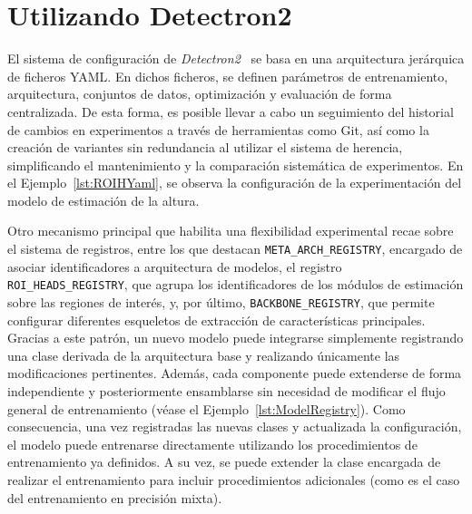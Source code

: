 \section{Utilizando Detectron2}\label{app:YAMLConfig}
El sistema de configuración de \emph{Detectron2}~\cite{detectron2} se basa en una arquitectura jerárquica de ficheros YAML.
En dichos ficheros, se definen parámetros de entrenamiento, arquitectura, conjuntos de datos, optimización y evaluación de forma centralizada.
De esta forma, es posible llevar a cabo un seguimiento del historial de cambios en experimentos a través de herramientas como Git, así como
la creación de variantes sin redundancia al utilizar el sistema de herencia, simplificando el mantenimiento y la comparación sistemática de experimentos.
En el Ejemplo~\ref{lst:ROIHYaml}, se observa la configuración de la experimentación del modelo de estimación de la altura.
\par
Otro mecanismo principal que habilita una flexibilidad experimental recae sobre el sistema de registros, entre los que
destacan \lstinline{META_ARCH_REGISTRY}, encargado de asociar identificadores a arquitectura de modelos, el registro \lstinline{ROI_HEADS_REGISTRY},
que agrupa los identificadores de los módulos de estimación sobre las regiones de interés,
y, por último, \lstinline{BACKBONE_REGISTRY}, que permite configurar diferentes esqueletos de extracción de características principales.
Gracias a este patrón, un nuevo modelo puede integrarse simplemente registrando una clase derivada de la arquitectura base y
realizando únicamente las modificaciones pertinentes.
Además, cada componente puede extenderse de forma independiente y posteriormente ensamblarse sin necesidad de
modificar el flujo general de entrenamiento (véase el Ejemplo~\ref{lst:ModelRegistry}).
Como consecuencia, una vez registradas las nuevas clases y actualizada la configuración, el modelo puede entrenarse
directamente utilizando los procedimientos de entrenamiento ya definidos. A su vez, se puede extender
la clase encargada de realizar el entrenamiento para incluir procedimientos adicionales (como es el caso
del entrenamiento en precisión mixta).

